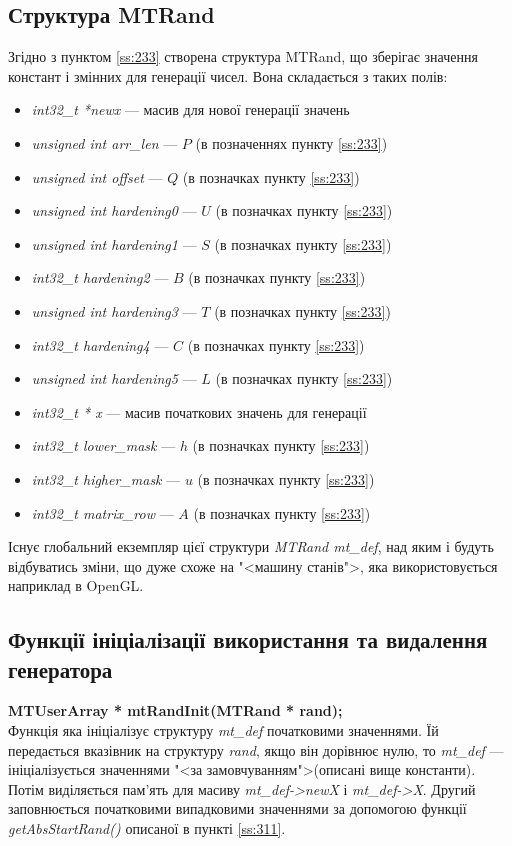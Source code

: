 \documentclass[oneside,final,14pt]{extreport}
\begin{document}
\begin{large}
\subsection{Структура MTRand}\label{ss:321}
Згідно з пунктом \ref{ss:233} створена структура MTRand, що зберігає значення констант 
і змінних для генерації чисел. Вона складається з таких полів:
\begin{itemize}
\item
{\itshape int32\_t *newx} --- масив для нової генерації значень
\item
{\itshape unsigned int arr\_len}  ---  $P$ (в позначеннях пункту \ref{ss:233})
\item
{\itshape unsigned int offset} ---  $Q$ (в позначках пункту \ref{ss:233})
\item
{\itshape unsigned int hardening0} --- $U$ (в позначках пункту \ref{ss:233})
\item
{\itshape unsigned int hardening1} --- $S$ (в позначках пункту \ref{ss:233})
\item
{\itshape int32\_t hardening2} --- $B$ (в позначках пункту \ref{ss:233})
\item
{\itshape unsigned int hardening3} --- $T$ (в позначках пункту \ref{ss:233})
\item
{\itshape int32\_t hardening4} --- $C$ (в позначках пункту \ref{ss:233})
\item
{\itshape unsigned int hardening5} --- $L$ (в позначках пункту \ref{ss:233})
\item
{\itshape int32\_t * x} --- масив початкових значень для генерації
\item
{\itshape int32\_t lower\_mask} --- $h$ (в позначках пункту \ref{ss:233})
\item
{\itshape int32\_t higher\_mask} --- $u$ (в позначках пункту \ref{ss:233})
\item
{\itshape int32\_t matrix\_row} --- $A$ (в позначках пункту \ref{ss:233})
\end{itemize}
Існує глобальний екземпляр цієї структури {\itshape MTRand mt\_def}, над яким 
і будуть відбуватись зміни, що дуже схоже на "<машину станів">, 
яка використовується наприклад в OpenGL.
\subsection{Функції ініціалізації використання та видалення генератора}\label{ss:322}
{\bfseries MTUserArray * mtRandInit(MTRand * rand);} \\

Функція яка ініціалізує структуру {\itshape mt\_def} початковими значеннями. 
Їй передається вказівник на структуру {\itshape rand}, якщо він дорівнює нулю, 
то {\itshape mt\_def} --- ініціалізується значеннями "<за замовчуванням">(описані вище константи). 
Потім виділяється пам'ять для масиву {\itshape mt\_def->newX} і {\itshape mt\_def->X}. 
Другий заповнюється початковими випадковими значеннями за допомогою функції 
{\itshape getAbsStartRand()} описаної в пункті \ref{ss:311}. 


\end{large}
\end{document}
